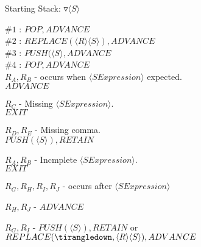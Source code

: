 \documentclass[a4paper,12pt]{article}
\newcommand{\nonterminal}[1]{\langle #1 \rangle}
\begin{document}
Starting Stack: $\triangledown \nonterminal{S}$

$\#1$ : $POP,ADVANCE$													\\
$\#2$ : $REPLACE(\nonterminal{R}\nonterminal{S}),ADVANCE$	\\
$\#3$ : $PUSH(\nonterminal{S},ADVANCE$								\\
$\#4$ : $POP,ADVANCE$													\\

$R_{A}, R_{B}$ - occurs when $\nonterminal{S Expression}$ expected. \\ $ADVANCE$

$R_{C}$ - Missing $\nonterminal{S Expression}$. \\ $EXIT$

$R_{D}, R_{E}$ - Missing comma. \\ $PUSH(\nonterminal{S}),RETAIN$

$R_{A}, R_{B}$ - Incmplete $\nonterminal{S Expression}$. \\ $EXIT$

$R_{G}, R_{H}, R_{I}, R_{J}$ - occurs after $\nonterminal{S Expression}$

$R_{H}, R_{J}$ - $ADVANCE$

$R_{G}, R_{I}$ - $PUSH(\nonterminal{S}),RETAIN$ or
$REPLACE(\tirangledown,\nonterminal{R}\nonterminal{S}),ADVANCE$

\begin{table}[hbtp]


\end{table}
\end{document}
